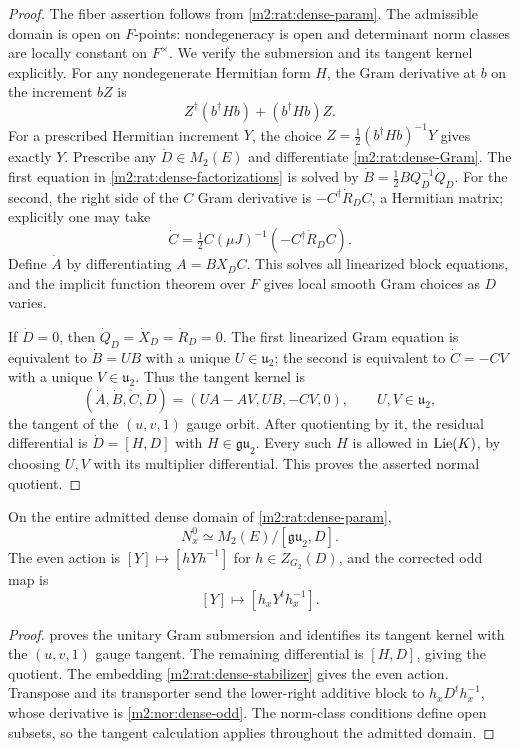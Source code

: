 \begin{proof}
The fiber assertion follows from \cref{m2:rat:dense-param}. The
admissible domain is open on $F$-points: nondegeneracy is open and
determinant norm classes are locally constant on $F^\times$.
We verify the submersion and its tangent kernel explicitly.
For any nondegenerate Hermitian form $H$, the Gram derivative at $b$
on the increment $bZ$ is
\[
 Z^\dagger(b^\dagger Hb)+(b^\dagger Hb)Z.
\]
For a prescribed Hermitian increment $Y$, the choice
$Z=\tfrac12(b^\dagger Hb)^{-1}Y$ gives exactly $Y$.
Prescribe any $\dot D\in M_2(E)$ and differentiate
\eqref{m2:rat:dense-Gram}. The first equation in
\eqref{m2:rat:dense-factorizations} is solved by
$\dot B=\tfrac12 BQ_D^{-1}\dot Q_D$.
For the second, the right side of the $C$ Gram derivative is
$-C^\dagger\dot R_DC$, a Hermitian matrix; explicitly one may take
\[
 \dot C=\tfrac12 C(\mu J)^{-1}(-C^\dagger\dot R_DC).
\]
Define $\dot A$ by differentiating $A=BX_DC$. This solves all
linearized block equations, and the implicit function theorem over
$F$ gives local smooth Gram choices as $D$ varies.

If $\dot D=0$, then $\dot Q_D=\dot X_D=\dot R_D=0$.
The first linearized Gram equation is equivalent to
$\dot B=UB$ with a unique $U\in\mathfrak u_2$; the second is
equivalent to $\dot C=-CV$ with a unique $V\in\mathfrak u_2$.
Thus the tangent kernel is
\begin{equation}\label{m2:rat:dense-tangent-kernel}
 (\dot A,\dot B,\dot C,\dot D)=(UA-AV,UB,-CV,0),
 \qquad U,V\in\mathfrak u_2,
\end{equation}
the tangent of the $(u,v,1)$ gauge orbit. After quotienting by it,
the residual differential is $\dot D=[H,D]$ with
$H\in\mathfrak{gu}_2$. Every such $H$ is allowed in $\operatorname{Lie}(K)$,
by choosing $U,V$ with its multiplier differential. This proves
the asserted normal quotient.
\end{proof}

\begin{lemma}\label{m2:nor:dense-quotient}
On the entire admitted dense domain of \cref{m2:rat:dense-param},
\begin{equation}\label{m2:nor:dense-normal}
 N_x^0\simeq M_2(E)/[\mathfrak{gu}_2,D].
\end{equation}
The even action is $[Y]\mapsto[hYh^{-1}]$ for
$h\in Z_{G_2}(D)$, and the corrected odd map is
\begin{equation}\label{m2:nor:dense-odd}
 [Y]\longmapsto[h_xY^th_x^{-1}].
\end{equation}
\end{lemma}
\begin{proof}
 proves the unitary Gram submersion and
identifies its tangent kernel with the $(u,v,1)$ gauge tangent.
The remaining differential is $[H,D]$, giving the quotient.
The embedding \eqref{m2:rat:dense-stabilizer} gives the even action.
Transpose and its transporter send the lower-right additive block
to $h_xD^th_x^{-1}$, whose derivative is \eqref{m2:nor:dense-odd}.
The norm-class conditions define open subsets, so the tangent
calculation applies throughout the admitted domain.
\end{proof}

